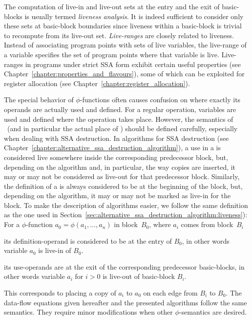 The computation of live-in and live-out sets at the entry and the exit of basic-blocks is usually termed \emph{liveness analysis}.
It is indeed sufficient to consider only these sets at basic-block boundaries since liveness within a basic-block is trivial to recompute from its live-out set.
\emph{Live-ranges} are closely related to liveness.
Instead of associating program points with sets of live variables, the live-range of a variable specifies the set of program points where that variable is live.
Live-ranges in programs under strict SSA form exhibit certain useful properties (see Chapter~\ref{chapter:properties_and_flavours}), some of which can be exploited for register allocation (see Chapter~\ref{chapter:register_allocation}).

The special behavior of $\phi$-functions often causes confusion on where exactly its operands are actually used and defined.
For a regular operation, variables are used and defined where the operation takes place.
However, the semantics of \phifuns\ (and in particular the actual place of \phiuses) should be defined carefully, especially when dealing with SSA destruction.
In algorithms for SSA destruction (see Chapter~\ref{chapter:alternative_ssa_destruction_algorithm}), a use in a \phifun is considered live somewhere inside the corresponding predecessor block, but, depending on the algorithm and, in particular, the way copies are inserted, it may or may not be considered as live-out for that predecessor block.
Similarly, the definition of a \phifun is always considered to be at the beginning of the block, but, depending on the algorithm, it may or may not be marked as live-in for the block.
To make the description of algorithms easier, we follow the same definition as the one used in Section~\ref{sec:alternative_ssa_destruction_algorithm:liveness}):
For a $\phi$-function $a_0 = \phi(a_1, \ldots, a_n)$ in block~$B_0$, where $a_i$ comes from block~$B_i$
\begin{compactitem}
\item
	its definition-operand is considered to be at the entry of $B_0$, in other words variable $a_0$ is live-in of $B_0$.
\item
	its use-operands are at the exit of the corresponding predecessor basic-blocks, in other words variable $a_i$ for $i>0$ is live-out of basic-block $B_i$.
\end{compactitem}
This corresponds to placing a copy of $a_i$ to $a_0$ on each edge from $B_i$ to $B_0$.
The data-flow equations given hereafter and the presented algorithms follow the same semantics.
They require minor modifications when other $\phi$-semantics are desired.

